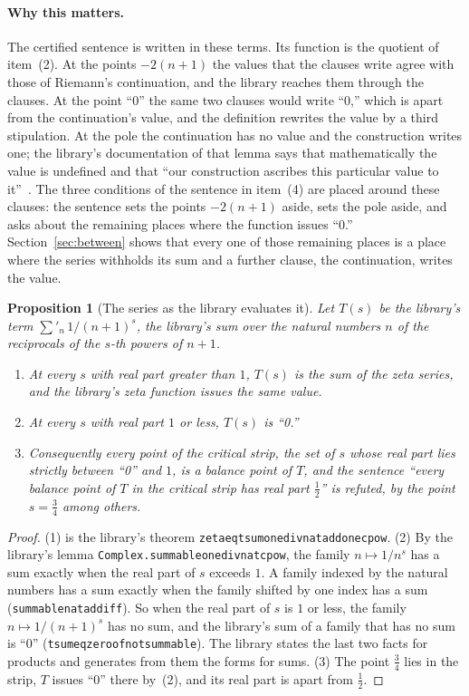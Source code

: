 \documentclass[11pt]{article}
\newtheorem{proposition}[theorem]{Proposition}
\theoremstyle{definition}
\theoremstyle{remark}
\DeclareRobustCommand{\lean}[1]{{\renewcommand{\_}{\textunderscore\allowbreak}\texttt{#1}}}
\begin{document}
\paragraph{Why this matters.} The certified sentence is written in these terms. Its function is the quotient of item~(2). At the points $-2(n+1)$ the values that the clauses write agree with those of Riemann's continuation, and the library reaches them through the clauses. At the point ``0'' the same two clauses would write ``0,'' which is apart from the continuation's value, and the definition rewrites the value by a third stipulation. At the pole the continuation has no value and the construction writes one; the library's documentation of that lemma says that mathematically the value is undefined and that ``our construction ascribes this particular value to it''~\citep{mathlib}. The three conditions of the sentence in item~(4) are placed around these clauses: the sentence sets the points $-2(n+1)$ aside, sets the pole aside, and asks about the remaining places where the function issues ``0.'' Section~\ref{sec:between} shows that every one of those remaining places is a place where the series withholds its sum and a further clause, the continuation, writes the value.

\begin{proposition}[The series as the library evaluates it]\label{prop:series}
Let $T(s)$ be the library's term $\sum'_{n}\,1/(n+1)^{s}$, the library's sum over the natural numbers $n$ of the reciprocals of the $s$-th powers of $n+1$.
\begin{enumerate}[leftmargin=2em,itemsep=1pt]
\item At every $s$ with real part greater than $1$, $T(s)$ is the sum of the zeta series, and the library's zeta function issues the same value.
\item At every $s$ with real part $1$ or less, $T(s)$ is ``0.''
\item Consequently every point of the critical strip, the set of $s$ whose real part lies strictly between ``0'' and $1$, is a balance point of $T$, and the sentence ``every balance point of $T$ in the critical strip has real part $\tfrac12$'' is refuted, by the point $s=\tfrac34$ among others.
\end{enumerate}
\end{proposition}

\begin{proof}
(1) is the library's theorem \lean{zeta\_eq\_tsum\_one\_div\_nat\_add\_one\_cpow}. (2) By the library's lemma \lean{Complex.summable\_one\_div\_nat\_cpow}, the family $n\mapsto 1/n^{s}$ has a sum exactly when the real part of $s$ exceeds $1$. A family indexed by the natural numbers has a sum exactly when the family shifted by one index has a sum (\lean{summable\_nat\_add\_iff}). So when the real part of $s$ is $1$ or less, the family $n\mapsto 1/(n+1)^{s}$ has no sum, and the library's sum of a family that has no sum is ``0'' (\lean{tsum\_eq\_zero\_of\_not\_summable}). The library states the last two facts for products and generates from them the forms for sums. (3) The point $\tfrac34$ lies in the strip, $T$ issues ``0'' there by~(2), and its real part is apart from $\tfrac12$.
\end{proof}
\end{document}
